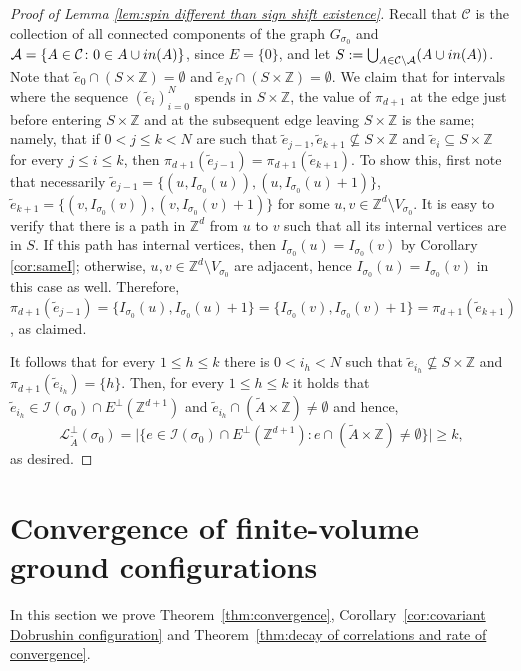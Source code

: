 \documentclass[11pt, reqno]{amsart}
\newcommand{\Z}{\mathbb{Z}}
\numberwithin{equation}{section}
\begin{document}
\begin{proof}[Proof of Lemma \ref{lem:spin different than sign shift existence}]
Recall that $\mathcal C$ is the collection of all connected components of the graph $G_{\sigma_0}$ and ${\mathcal A}=\{A\in{\mathcal C}\colon 0\in A\cup{\rm in}(A)\}$, since $E=\{0\}$,
and let $S:=\bigcup_{A\in{\mathcal C}\setminus{\mathcal A}}( A\cup{\rm in}(A))$.
Note that $\tilde{e}_0\cap(S\times{\mathbb Z})=\emptyset$ and $\tilde{e}_N\cap (S\times{\mathbb Z})=\emptyset$.
We claim that for intervals where the sequence $(\tilde{e}_i)_{i=0}^N$ spends in $S\times{\mathbb Z}$, the value of $\pi_{d+1}$ at the edge just before entering $S\times{\mathbb Z}$ and at the subsequent edge leaving $S\times{\mathbb Z}$ is the same;
namely, that if $0<j\leq k<N$ are such that $\tilde{e}_{j-1}, \tilde{e}_{k+1}\nsubseteq S\times{\mathbb Z}$ and $\tilde{e}_i\subseteq S\times{\mathbb Z}$ for every $j\leq i\leq k$, then $\pi_{d+1}(\tilde{e}_{j-1})=\pi_{d+1}(\tilde{e}_{k+1})$.
To show this, first note that necessarily $\tilde{e}_{j-1}=\{(u,I_{\sigma_0}(u)),(u,I_{\sigma_0}(u)+1)\}$, $\tilde{e}_{k+1}=\{(v,I_{\sigma_0}(v)),(v,I_{\sigma_0}(v)+1)\}$ for some
$u,v\in {\mathbb Z}^d\setminus V_{\sigma_0}$. 
It is easy to verify that there is a path in $\Z^d$ from $u$ to $v$ such that all its internal vertices are in $S$.
If this path has internal vertices, then $I_{\sigma_0}(u)=I_{\sigma_0}(v)$ by Corollary \ref{cor:sameI}; otherwise, $u,v\in\Z^d\setminus V_{\sigma_0}$ are adjacent, hence $I_{\sigma_0}(u)=I_{\sigma_0}(v)$ in this case as well.  
Therefore,
$\pi_{d+1}(\tilde{e}_{j-1})=\{I_{\sigma_0}(u),I_{\sigma_0}(u)+1\}=\{I_{\sigma_0}(v),I_{\sigma_0}(v)+1\}=\pi_{d+1}(\tilde{e}_{k+1})$, as claimed.

It follows that for every $1\leq h\leq k$ there is 
$0<i_h<N$ such that $\tilde{e}_{i_h}\nsubseteq S\times{\mathbb Z}$ and $\pi_{d+1}(\tilde{e}_{i_h})=\{h\}$. 
Then, for every $1\leq h\leq k$ it holds that 
$\tilde{e}_{i_h}\in {\mathcal I}(\sigma_0)\cap E^{\perp}({\mathbb Z}^{d+1})$ and $\tilde{e}_{i_h}\cap(\tilde{A}\times{\mathbb Z})\neq\emptyset$ and hence, 
$${\mathcal L}^{\perp}_{\tilde{A}}(\sigma_0)=\lvert\{e\in {\mathcal I}(\sigma_0)\cap E^{\perp}({\mathbb Z}^{d+1})\colon e\cap(\tilde{A}\times{\mathbb Z})\neq\emptyset\}\rvert\geq k,$$
as desired.  
\end{proof}

\section{Convergence of finite-volume ground configurations}\label{sec:proof of convergence theorem}
In this section we prove Theorem~\ref{thm:convergence}, Corollary~\ref{cor:covariant Dobrushin configuration} and Theorem~\ref{thm:decay of correlations and rate of convergence}.
\end{document}
